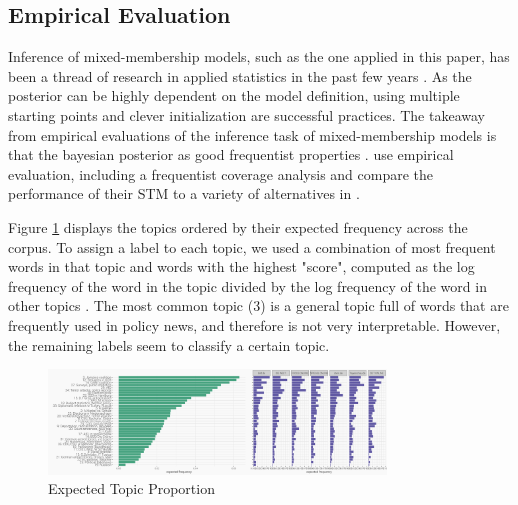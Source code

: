 \documentclass[12pt,a4paper,notitlepage]{article}
\begin{document}
\subsection{Empirical Evaluation}

Inference of mixed-membership models, such as the one applied in this paper, has been a thread of research in applied statistics in the past few years \citep{blei_latent_2003} \citep{erosheva_mixed-membership_2004} \citep{braun_variational_2010}. As the posterior can be highly dependent on the model definition, using multiple starting points and clever initialization are successful practices. The takeaway from empirical evaluations of the inference task of mixed-membership models is that the bayesian posterior as good frequentist properties \citep{wallach_evaluation_2009}. \citet{roberts_model_2016} use empirical evaluation, including a frequentist coverage analysis and compare the performance of their STM to a variety of alternatives in \citet{roberts_navigating_2016}. 

Figure \ref{fig_topic_proportion} displays the topics ordered by their expected frequency across the corpus. To assign a label to each topic, we used a combination of most frequent words in that topic and words with the highest "score", computed as the log frequency of the word in the topic divided by the log frequency of the word in other topics \citep{roberts_stm:_2016}. The most common topic (3) is a general topic full of words that are frequently used in policy news, and therefore is not very interpretable. However, the remaining labels seem to classify a certain topic.  

\begin{figure}[H]
	\begin{center}
	\includegraphics[width=0.8\textwidth,keepaspectratio]{../figs/topic_proportion.png}
	\caption{Expected Topic Proportion}
	\label{fig_topic_proportion}
	\end{center}
\end{figure}
\end{document}
